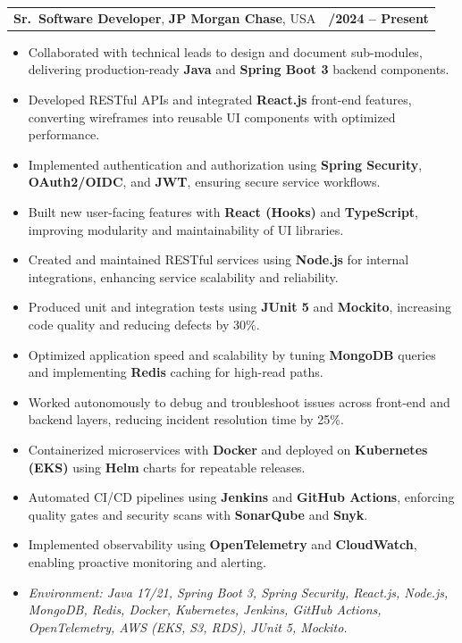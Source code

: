 \documentclass[letterpaper,11pt]{article}
\makeatletter
\newcommand{\resumeItem}[1]{
  \item\footnotesize{
    {#1 \vspace{-2pt}}
  }
}
\newcommand{\resumeSubheading}[4]{
  \vspace{-2pt}\item
    \begin{tabular*}{1.0\textwidth}[t]{l@{\extracolsep{\fill}}r}
      \textbf{\fontsize{10pt}{14pt}\selectfont #3}, \textbf{\fontsize{10pt}{14pt}\selectfont #1}, \fontsize{10pt}{14pt}\selectfont #4 & \textbf{\fontsize{10pt}{14pt}\selectfont #2} \\
    \end{tabular*}\vspace{-7pt}
}
\newcommand{\resumeItemListStart}{\begin{itemize}[leftmargin=*]}
\newcommand{\resumeItemListEnd}{\end{itemize}\vspace{-5pt}}
\makeatother
\begin{document}
\resumeSubheading
{JP Morgan Chase}{09/2024 -- Present}
{Sr.\ Software Developer}{USA}
\resumeItemListStart
  \resumeItem{Collaborated with technical leads to design and document sub-modules, delivering production-ready \textbf{Java} and \textbf{Spring Boot 3} backend components.}
  \resumeItem{Developed RESTful APIs and integrated \textbf{React.js} front-end features, converting wireframes into reusable UI components with optimized performance.}
  \resumeItem{Implemented authentication and authorization using \textbf{Spring Security}, \textbf{OAuth2/OIDC}, and \textbf{JWT}, ensuring secure service workflows.}
  \resumeItem{Built new user-facing features with \textbf{React (Hooks)} and \textbf{TypeScript}, improving modularity and maintainability of UI libraries.}
  \resumeItem{Created and maintained RESTful services using \textbf{Node.js} for internal integrations, enhancing service scalability and reliability.}
  \resumeItem{Produced unit and integration tests using \textbf{JUnit 5} and \textbf{Mockito}, increasing code quality and reducing defects by 30\%.}
  \resumeItem{Optimized application speed and scalability by tuning \textbf{MongoDB} queries and implementing \textbf{Redis} caching for high-read paths.}
  \resumeItem{Worked autonomously to debug and troubleshoot issues across front-end and backend layers, reducing incident resolution time by 25\%.}
  \resumeItem{Containerized microservices with \textbf{Docker} and deployed on \textbf{Kubernetes (EKS)} using \textbf{Helm} charts for repeatable releases.}
  \resumeItem{Automated CI/CD pipelines using \textbf{Jenkins} and \textbf{GitHub Actions}, enforcing quality gates and security scans with \textbf{SonarQube} and \textbf{Snyk}.}
  \resumeItem{Implemented observability using \textbf{OpenTelemetry} and \textbf{CloudWatch}, enabling proactive monitoring and alerting.}
  \resumeItem{\textit{Environment: Java 17/21, Spring Boot 3, Spring Security, React.js, Node.js, MongoDB, Redis, Docker, Kubernetes, Jenkins, GitHub Actions, OpenTelemetry, AWS (EKS, S3, RDS), JUnit 5, Mockito.}}
\resumeItemListEnd
\end{document}
